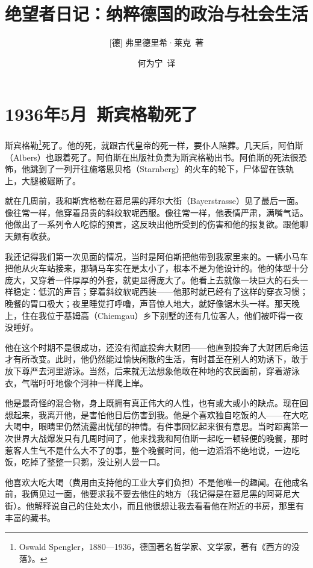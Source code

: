 \documentclass[UTF8]{ctexart}
\title{绝望者日记：纳粹德国的政治与社会生活}
\author{[德] 弗里德里希·莱克\ 著}
\date{何为宁\ 译}
\begin{document}
\maketitle


\newpage

\tableofcontents

\newpage

\section{1936年5月\ 斯宾格勒死了}

斯宾格勒\footnote{Oswald Spengler，1880—1936，德国著名哲学家、文学家，著有《西方的没落》。}死了。他的死，就跟古代皇帝的死一样，要仆人陪葬。几天后，阿伯斯（Albers）也跟着死了。阿伯斯在出版社负责为斯宾格勒出书。阿伯斯的死法很恐怖，他跳到了一列开往施塔恩贝格（Starnberg）的火车的轮下，尸体留在铁轨上，大腿被碾断了。

就在几周前，我和斯宾格勒在慕尼黑的拜尔大街（Bayerstrasse）见了最后一面。像往常一样，他穿着昂贵的斜纹软呢西服。像往常一样，他表情严肃，满嘴气话。他做出了一系列令人吃惊的预言，这反映出他所受到的伤害和他的报复欲。跟他聊天颇有收获。

我还记得我们第一次见面的情况，当时是阿伯斯把他带到我家里来的。一辆小马车把他从火车站接来，那辆马车实在是太小了，根本不是为他设计的。他的体型十分庞大，又穿着一件厚厚的外套，就更显得庞大了。他看上去就像一块巨大的石头一样稳定：低沉的声音；穿着斜纹软呢西装——他那时就已经有了这样的穿衣习惯；晚餐的胃口极大；夜里睡觉打呼噜，声音惊人地大，就好像锯木头一样。那天晚上，住在我位于基姆高（Chiemgau）乡下别墅的还有几位客人，他们被吓得一夜没睡好。

他在这个时期不是很成功，还没有彻底投奔大财团——他直到投奔了大财团后命运才有所改变。此时，他仍然能过愉快闲散的生活，有时甚至在别人的劝诱下，敢于放下尊严去河里游泳。当然，后来就无法想象他敢在种地的农民面前，穿着游泳衣，气喘吁吁地像个河神一样爬上岸。

他是最奇怪的混合物，身上既拥有真正伟大的人性，也有或大或小的缺点。现在回想起来，我离开他，是害怕他日后伤害到我。他是个喜欢独自吃饭的人——在大吃大喝中，眼睛里仍然流露出忧郁的神情。有件事回忆起来很有意思。当时距离第一次世界大战爆发只有几周时间了，他来找我和阿伯斯一起吃一顿轻便的晚餐，那时惹客人生气不是什么大不了的事，整个晚餐时间，他一边滔滔不绝地说，一边吃饭，吃掉了整整一只鹅，没让别人尝一口。

他喜欢大吃大喝（费用由支持他的工业大亨们负担）不是他唯一的趣闻。在他成名前，我俩见过一面，他要求我不要去他住的地方（我记得是在慕尼黑的阿哥尼大街）。他解释说自己的住处太小，而且他很想让我去看看他在附近的书房，那里有丰富的藏书。
\end{document}
